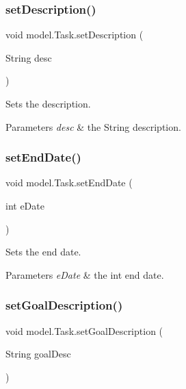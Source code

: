\subsubsection{set\+Description()}
{\footnotesize\ttfamily void model.\+Task.\+set\+Description (\begin{DoxyParamCaption}\item[{String}]{desc }\end{DoxyParamCaption})\hspace{0.3cm}{\ttfamily [private]}}

Sets the description. 
\begin{DoxyParams}{Parameters}
{\em desc} & the String description. \\
\hline
\end{DoxyParams}
\mbox{\label{classmodel_1_1_task_a5d9b4aaba5f0e7156f14dec76d9b4d12}} 
\subsubsection{set\+End\+Date()}
{\footnotesize\ttfamily void model.\+Task.\+set\+End\+Date (\begin{DoxyParamCaption}\item[{int}]{e\+Date }\end{DoxyParamCaption})\hspace{0.3cm}{\ttfamily [private]}}

Sets the end date. 
\begin{DoxyParams}{Parameters}
{\em e\+Date} & the int end date. \\
\hline
\end{DoxyParams}
\mbox{\label{classmodel_1_1_task_a7d6b49b4bbeb61f9eb67c7ab3b51c898}} 
\subsubsection{set\+Goal\+Description()}
{\footnotesize\ttfamily void model.\+Task.\+set\+Goal\+Description (\begin{DoxyParamCaption}\item[{String}]{goal\+Desc }\end{DoxyParamCaption})\hspace{0.3cm}{\ttfamily [private]}}

